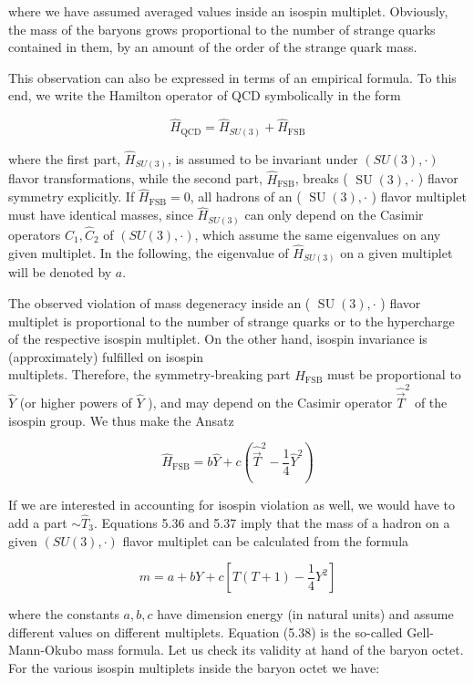 \documentclass[10pt, letterpaper]{article}
\begin{document}
where we have assumed averaged values inside an isospin multiplet. Obviously, the mass of the baryons grows proportional to the number of strange quarks contained in them, by an amount of the order of the strange quark mass.

This observation can also be expressed in terms of an empirical formula. To this end, we write the Hamilton operator of QCD symbolically in the form

$$
\hat{H}_{\mathrm{QCD}}=\hat{H}_{S U(3)}+\hat{H}_{\mathrm{FSB}}
$$

where the first part, $\hat{H}_{S U(3)}$, is assumed to be invariant under $(S U(3), \cdot)$ flavor transformations, while the second part, $\hat{H}_{\mathrm{FSB}}$, breaks ( $\operatorname{SU}(3), \cdot$ ) flavor symmetry explicitly. If $\hat{H}_{\mathrm{FSB}}=0$, all hadrons of an ( $\operatorname{SU}(3), \cdot$ ) flavor multiplet must have identical masses, since $\hat{H}_{S U(3)}$ can only depend on the Casimir operators $\hat{C}_{1}, \hat{C}_{2}$ of $(S U(3), \cdot)$, which assume the same eigenvalues on any given multiplet. In the following, the eigenvalue of $\hat{H}_{S U(3)}$ on a given multiplet will be denoted by $a$.

The observed violation of mass degeneracy inside an ( $\operatorname{SU}(3), \cdot$ ) flavor multiplet is proportional to the number of strange quarks or to the hypercharge of the respective isospin multiplet. On the other hand, isospin invariance is (approximately) fulfilled on isospin\\
multiplets. Therefore, the symmetry-breaking part $\hat{H}_{\mathrm{FSB}}$ must be proportional to $\hat{Y}$ (or higher powers of $\hat{Y}$ ), and may depend on the Casimir operator $\hat{\vec{T}}^{2}$ of the isospin group. We thus make the Ansatz

$$
\hat{H}_{\mathrm{FSB}}=b \hat{Y}+c\left(\hat{\vec{T}}^{2}-\frac{1}{4} \hat{Y}^{2}\right)
$$

If we are interested in accounting for isospin violation as well, we would have to add a part $\sim \hat{T}_{3}$. Equations 5.36 and 5.37 imply that the mass of a hadron on a given $(S U(3), \cdot)$ flavor multiplet can be calculated from the formula

$$
m=a+b Y+c\left[T(T+1)-\frac{1}{4} Y^{2}\right]
$$

where the constants $a, b, c$ have dimension energy (in natural units) and assume different values on different multiplets. Equation (5.38) is the so-called Gell-Mann-Okubo mass formula. Let us check its validity at hand of the baryon octet. For the various isospin multiplets inside the baryon octet we have:
\end{document}
